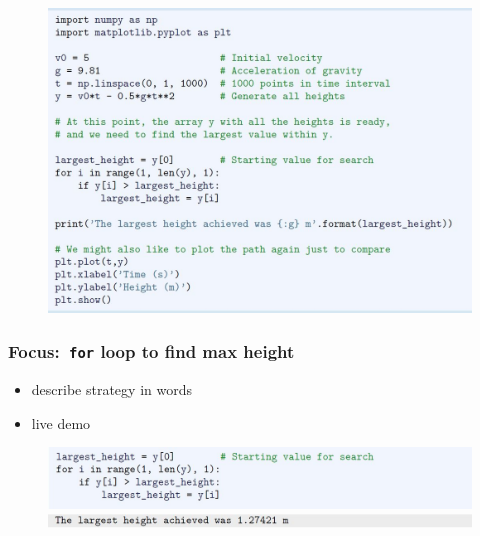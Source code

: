 \documentclass[14pt]{beamer}
\begin{document}

\begin{frame}[fragile]

\frametitle{}

\begin{figure}[ht]
	\centering
	\includegraphics[width=\textwidth]{figures/LLp71a}
\end{figure}

\end{frame}


\begin{frame}[fragile]

\frametitle{Focus:~\texttt{for} loop to find max height}

\begin{itemize}
	\item describe strategy in words
	\item live demo
\end{itemize}


\begin{figure}[ht]
	\centering
	\includegraphics[width=\textwidth]{figures/LLp71b}
	\includegraphics[width=\textwidth]{figures/LLp71c}
\end{figure}

\end{frame}
\end{document}
